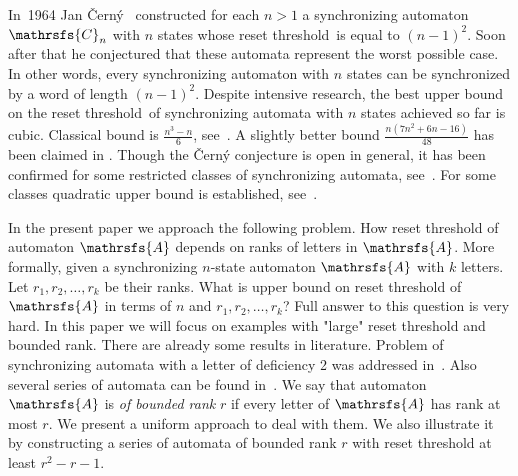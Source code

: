 \documentclass[11pt]{llncs}
\newcommand{\rl}{reset threshold}
\newcommand{\A}{\mathrsfs{A}}
\begin{document}
In~1964 Jan \v{C}ern\'{y}~\cite{Ce64} constructed for each $n>1$ a
synchronizing automaton $\mathrsfs{C}_n$ with $n$ states whose \rl\ is equal to
$(n-1)^2$. Soon after that he conjectured that these automata represent the
worst possible case. In other words, every synchronizing automaton with $n$ states can
be synchronized by a word of length $(n-1)^2$. Despite intensive research, the best
upper bound on the \rl\ of synchronizing automata with $n$ states achieved so
far is cubic. Classical bound is $\frac{n^3-n}6$, see~\cite{Pi83}. A slightly better bound
$\frac{n(7n^2+6n-16)}{48}$ has been claimed in \cite{Tr11}.
Though the \v{C}ern\'{y} conjecture is open in general, it
has been confirmed for some restricted classes of synchronizing automata, see~\cite{AS09,Du98,Ka03,Tr07,Vo09}.
For some classes quadratic upper bound is established, see~\cite{BBP,Rys}.

In the present paper we approach the following problem. How reset threshold of automaton $\A$ depends
on ranks of letters in $\A$. More formally, given a synchronizing $n$-state automaton $\A$
with $k$ letters. Let $r_1, r_2, \ldots, r_k$ be their ranks. What is upper bound
on reset threshold of $\A$ in terms of $n$ and $r_1, r_2, \ldots, r_k$?
Full answer to this question is very hard. In this paper we will focus on examples with "large" reset threshold
and bounded rank. There are already some results in literature. Problem of synchronizing automata
with a letter of deficiency 2 was addressed in~\cite{AVZ}. Also several series of automata can be found in~\cite{AGV}.
We say that automaton $\A$ is \emph{of bounded rank} $r$ if every letter of $\A$ has rank at most $r$. We present
a uniform approach to deal with them. We also illustrate it by constructing a series of automata of bounded rank $r$
with reset threshold at least $r^2 -r - 1$.
\end{document}
